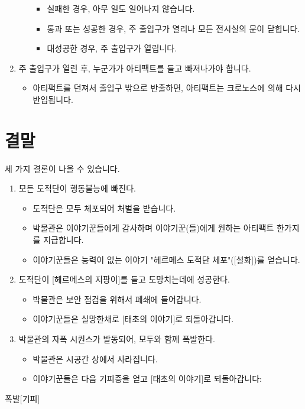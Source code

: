 \documentclass{report}
\begin{document}
\begin{enumerate}
\begin{itemize}
\begin{itemize}
				\item 실패한 경우, 아무 일도 일어나지 않습니다.
				\item 통과 또는 성공한 경우, 주 출입구가 열리나 모든 전시실의 문이 닫힙니다.
				\item 대성공한 경우, 주 출입구가 열립니다.
			\end{itemize}
		\end{itemize}
		\item 주 출입구가 열린 후, 누군가가 아티팩트를 들고 빠져나가야 합니다.
		\begin{itemize}
			\item 아티팩트를 던져서 출입구 밖으로 반출하면, 아티팩트는 크로노스에 의해 다시 반입됩니다.
		\end{itemize}
	\end{enumerate}
	
	\section*{결말}
	세 가지 결론이 나올 수 있습니다.
	\begin{enumerate}
		\item 모든 도적단이 행동불능에 빠진다.
		\begin{itemize}
			\item 도적단은 모두 체포되어 처벌을 받습니다.
			\item 박물관은 이야기꾼들에게 감사하며 이야기꾼(들)에게 원하는 아티팩트 한가지를 지급합니다.
			\item 이야기꾼들은 능력이 없는 이야기 "헤르메스 도적단 체포"([설화])를 얻습니다.
		\end{itemize}
		
		\item 도적단이 [헤르메스의 지팡이]를 들고 도망치는데에 성공한다.
		\begin{itemize}
			\item 박물관은 보안 점검을 위해서 폐쇄에 들어갑니다.
			\item 이야기꾼들은 실망한채로 [태초의 이야기]로 되돌아갑니다.
		\end{itemize}
		
		\item 박물관의 자폭 시퀀스가 발동되어, 모두와 함께 폭발한다.
		\begin{itemize}
			\item 박물관은 시공간 상에서 사라집니다.
			\item 이야기꾼들은 다음 기피증을 얻고 [태초의 이야기]로 되돌아갑니다:
		\end{itemize}
	\end{enumerate}
	\begin{spoiler}{폭발}{[기피]}
	\end{spoiler}
\end{document}
